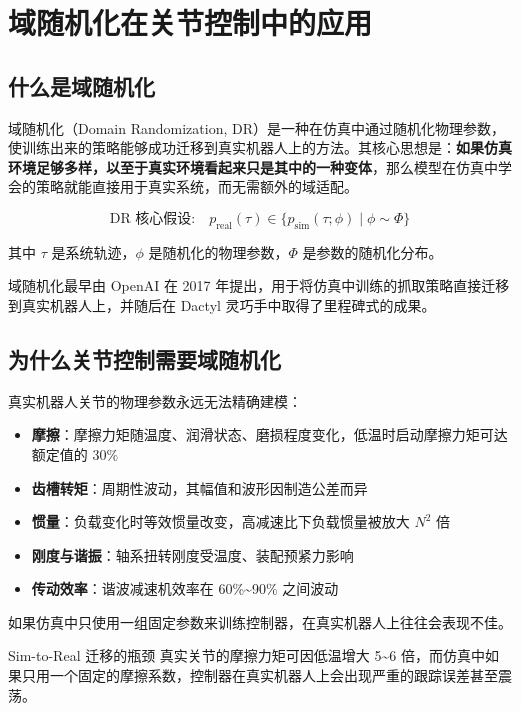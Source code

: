 \chapter{域随机化在关节控制中的应用}

\section{什么是域随机化}

域随机化（Domain Randomization, DR）是一种在仿真中通过随机化物理参数，使训练出来的策略能够成功迁移到真实机器人上的方法。其核心思想是：\textbf{如果仿真环境足够多样，以至于真实环境看起来只是其中的一种变体}，那么模型在仿真中学会的策略就能直接用于真实系统，而无需额外的域适配。

\begin{equation}
\text{DR 核心假设:} \quad
p_{\text{real}}(\tau) \in \{p_{\text{sim}}(\tau; \phi) \;|\; \phi \sim \Phi\}
\end{equation}

其中 \(\tau\) 是系统轨迹，\(\phi\) 是随机化的物理参数，\(\Phi\) 是参数的随机化分布。

域随机化最早由 OpenAI 在 2017 年提出，用于将仿真中训练的抓取策略直接迁移到真实机器人上，并随后在 Dactyl 灵巧手中取得了里程碑式的成果。

\section{为什么关节控制需要域随机化}

真实机器人关节的物理参数永远无法精确建模：

\begin{itemize}
    \item \textbf{摩擦}：摩擦力矩随温度、润滑状态、磨损程度变化，低温时启动摩擦力矩可达额定值的 30\%
    \item \textbf{齿槽转矩}：周期性波动，其幅值和波形因制造公差而异
    \item \textbf{惯量}：负载变化时等效惯量改变，高减速比下负载惯量被放大 \(N^2\) 倍
    \item \textbf{刚度与谐振}：轴系扭转刚度受温度、装配预紧力影响
    \item \textbf{传动效率}：谐波减速机效率在 60\%\textasciitilde 90\% 之间波动
\end{itemize}

如果仿真中只使用一组固定参数来训练控制器，在真实机器人上往往会表现不佳。

\begin{engineeringbox}{Sim-to-Real 迁移的瓶颈}
    真实关节的摩擦力矩可因低温增大 5\textasciitilde 6 倍，而仿真中如果只用一个固定的摩擦系数，控制器在真实机器人上会出现严重的跟踪误差甚至震荡。
\end{engineeringbox}

